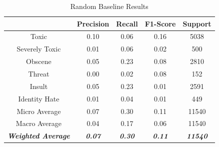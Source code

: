 \documentclass{article}
\begin{document}
{{	  \begin{table}[h!]
		  \centering
		  \begin{tabular}{|c|| c c c c|}
			  \hline
			                                     & Precision              & Recall                 & F1-Score               & Support                 \\ [0.5ex]
			  \hline\hline
			  Toxic                              & 0.10                   & 0.06                   & 0.16                   & 5038                    \\
			  Severely Toxic                     & 0.01                   & 0.06                   & 0.02                   & 500                     \\
			  Obscene                            & 0.05                   & 0.23                   & 0.08                   & 2810                    \\
			  Threat                             & 0.00                   & 0.02                   & 0.08                   & 152                     \\
			  Insult                             & 0.05                   & 0.23                   & 0.01                   & 2591                    \\
			  Identity Hate                      & 0.01                   & 0.04                   & 0.01                   & 449                     \\
			  \hline\hline
			  Micro Average                      & 0.07                   & 0.30                   & 0.11                   & 11540                   \\
			  Macro Average                      & 0.04                   & 0.17                   & 0.06                   & 11540                   \\
			  \textit{\textbf{Weighted Average}} & \textit{\textbf{0.07}} & \textit{\textbf{0.30}} & \textit{\textbf{0.11}} & \textit{\textbf{11540}} \\

			  \hline
		  \end{tabular}
		  \caption{Random Baseline Results}
		  \label{table:rand-base}
	  \end{table}
  }

 }
\end{document}
